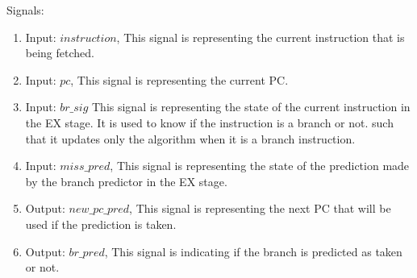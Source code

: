Signals:
\begin{enumerate}
    \item Input: $instruction$, This signal is representing the current instruction that is being fetched.
    \item Input: $pc$, This signal is representing the current PC.
    \item Input: $br\_sig$ This signal is representing the state of the current instruction in the EX stage. It is used to know if the instruction is a branch or not.
    such that it updates only the algorithm when it is a branch instruction.
    \item Input: $miss\_pred$, This signal is representing the state of the prediction made by the branch predictor in the EX stage.
    \item Output: $new\_pc\_pred$, This signal is representing the next PC that will be used if the prediction is taken.
    \item Output: $br\_pred$, This signal is indicating if the branch is predicted as taken or not.
\end{enumerate}
